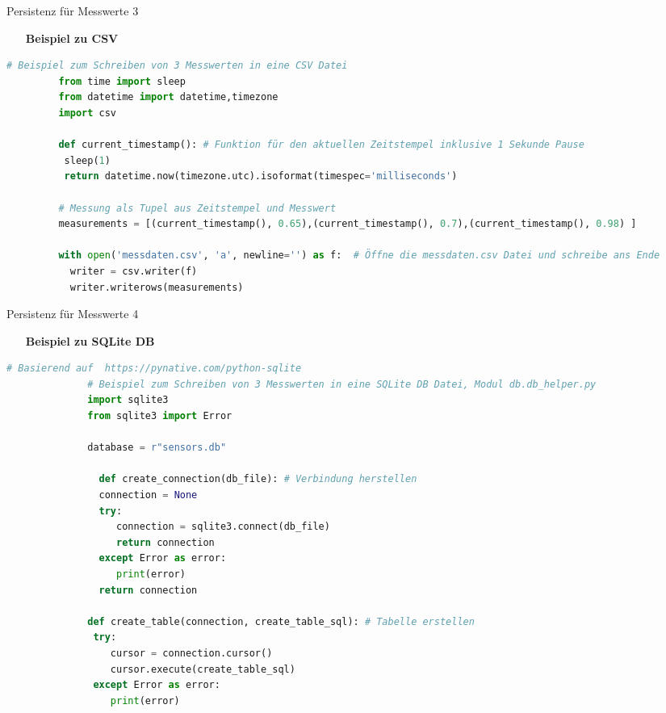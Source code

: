 \begin{frame}[fragile]{Persistenz für Messwerte 3}
    \begin{itemize}
        \setlength{\itemindent}{2.4in}
        \item [\textbf{Beispiel zu CSV}]
    \end{itemize}
       \begin{lstlisting}[language=Python, gobble=8]
         # Beispiel zum Schreiben von 3 Messwerten in eine CSV Datei
         from time import sleep
         from datetime import datetime,timezone
         import csv

         def current_timestamp(): # Funktion für den aktuellen Zeitstempel inklusive 1 Sekunde Pause
          sleep(1)
          return datetime.now(timezone.utc).isoformat(timespec='milliseconds')

         # Messung als Tupel aus Zeitstempel und Messwert
         measurements = [(current_timestamp(), 0.65),(current_timestamp(), 0.7),(current_timestamp(), 0.98) ]

         with open('messdaten.csv', 'a', newline='') as f:  # Öffne die messdaten.csv Datei und schreibe ans Ende
           writer = csv.writer(f)
           writer.writerows(measurements)
        \end{lstlisting}

\end{frame}




\begin{frame}[fragile]{Persistenz für Messwerte 4}
    \begin{itemize}
        \setlength{\itemindent}{2.4in}
        \item [\textbf{Beispiel zu SQLite DB}]
    \end{itemize}
       \begin{lstlisting}[language=Python, gobble=8]
              # Basierend auf  https://pynative.com/python-sqlite
              # Beispiel zum Schreiben von 3 Messwerten in eine SQLite DB Datei, Modul db.db_helper.py
              import sqlite3
              from sqlite3 import Error

              database = r"sensors.db"

	            def create_connection(db_file): # Verbindung herstellen
                connection = None
                try:
                   connection = sqlite3.connect(db_file)
                   return connection
                except Error as error:
                   print(error)
                return connection

              def create_table(connection, create_table_sql): # Tabelle erstellen
               try:
                  cursor = connection.cursor()
                  cursor.execute(create_table_sql)
               except Error as error:
                  print(error)


        \end{lstlisting}

\end{frame}


